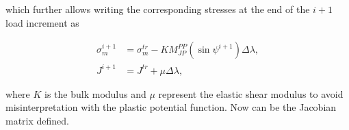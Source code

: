 which further allows writing the corresponding stresses at the end of the $i+1$ load increment as  

\begin{align}
	\sigma_m^{i+1} &= \sigma_m^{tr} - K M_{JP}^{PP} (\sin \psi^{i+1}) \Delta \lambda,\\
	J^{i+1} &= J^{tr} + \mu \Delta \lambda,
\end{align}

where $K$ is the bulk modulus and $\mu$ represent the elastic shear modulus to avoid misinterpretation with the plastic potential function. Now can be the Jacobian matrix defined.

